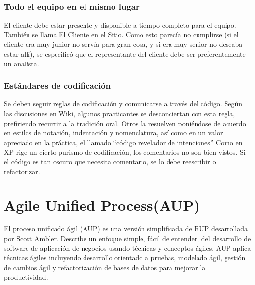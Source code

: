 \documentclass{article}
\begin{document}
\subsubsection{ Todo el equipo en el mismo lugar}
El cliente debe estar presente y disponible a
tiempo completo para el equipo. También se llama El Cliente en el Sitio. Como esto
parecía no cumplirse (si el cliente era muy junior no servía para gran cosa, y si era
muy senior no deseaba estar allí), se especificó que el representante del cliente debe
ser preferentemente un analista.

\subsubsection{Estándares de codificación}
Se deben seguir reglas de codificación y comunicarse a
través del código. Según las discusiones en Wiki, algunos practicantes se
desconciertan con esta regla, prefiriendo recurrir a la tradición oral. Otros la resuelven
poniéndose de acuerdo en estilos de notación, indentación y nomenclatura, así como
en un valor apreciado en la práctica, el llamado ``código revelador de intenciones''
Como en XP rige un cierto purismo de codificación, los comentarios no son bien
vistos. Si el código es tan oscuro que necesita comentario, se lo debe reescribir o
refactorizar.

\section{Agile Unified Process(AUP)}
El proceso unificado ágil (AUP) es una versión simplificada de RUP desarrollada por Scott Ambler. Describe un enfoque simple, fácil de entender, del desarrollo de software de aplicación de negocios usando técnicas y conceptos ágiles. AUP aplica técnicas ágiles incluyendo desarrollo orientado a pruebas, modelado ágil, gestión de cambios ágil y refactorización de bases de datos para mejorar la productividad.
\end{document}
